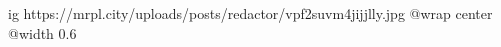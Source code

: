  
 
 
 
 

\ifcmt
  ig https://mrpl.city/uploads/posts/redactor/vpf2suvm4jijjlly.jpg
  @wrap center
  @width 0.6
\fi
